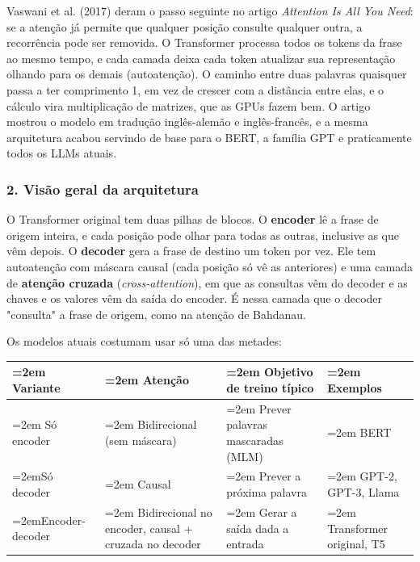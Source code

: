 \documentclass[12pt, a4paper]{article}
\begin{document}
Vaswani et al. (2017) deram o passo seguinte no artigo \emph{Attention Is All You Need}: se a atenção já permite que qualquer posição consulte qualquer outra, a recorrência pode ser removida. O Transformer processa todos os tokens da frase ao mesmo tempo, e cada camada deixa cada token atualizar sua representação olhando para os demais (autoatenção). O caminho entre duas palavras quaisquer passa a ter comprimento 1, em vez de crescer com a distância entre elas, e o cálculo vira multiplicação de matrizes, que as GPUs fazem bem. O artigo mostrou o modelo em tradução inglês-alemão e inglês-francês, e a mesma arquitetura acabou servindo de base para o BERT, a família GPT e praticamente todos os LLMs atuais.

\subsubsection{2. Visão geral da arquitetura}\label{2-visuxe3o-geral-da-arquitetura}

O Transformer original tem duas pilhas de blocos. O \textbf{encoder} lê a frase de origem inteira, e cada posição pode olhar para todas as outras, inclusive as que vêm depois. O \textbf{decoder} gera a frase de destino um token por vez. Ele tem autoatenção com máscara causal (cada posição só vê as anteriores) e uma camada de \textbf{atenção cruzada} (\emph{cross-attention}), em que as consultas vêm do decoder e as chaves e os valores vêm da saída do encoder. É nessa camada que o decoder "consulta" a frase de origem, como na atenção de Bahdanau.

Os modelos atuais costumam usar só uma das metades:

\begingroup
\setlength{\tabcolsep}{4.0pt}
\begin{longtable}{@{}>{\raggedright\hyphenpenalty=30\tolerance=999\emergencystretch=2em\arraybackslash}p{3.14cm}>{\raggedright\hyphenpenalty=30\tolerance=999\emergencystretch=2em\arraybackslash}p{4.95cm}>{\raggedright\hyphenpenalty=30\tolerance=999\emergencystretch=2em\arraybackslash}p{3.42cm}>{\raggedright\hyphenpenalty=30\tolerance=999\emergencystretch=2em\arraybackslash}p{2.93cm}@{}}
\toprule\noalign{}
Variante & Atenção & Objetivo de treino típico & Exemplos \\
\midrule\noalign{}
\endhead
\bottomrule\noalign{}
\endlastfoot
Só encoder & Bidirecional (sem máscara\allowbreak ) & Prever palavras mascaradas (MLM\allowbreak ) & BERT \\
Só decoder & Causal & Prever a próxima palavra & GPT-2, GPT-3, Llama \\
Encoder-decoder & Bidirecional no encoder, causal + cruzada no decoder & Gerar a saída dada a entrada & Transformer original, T5 \\
\end{longtable}
\endgroup
\end{document}
